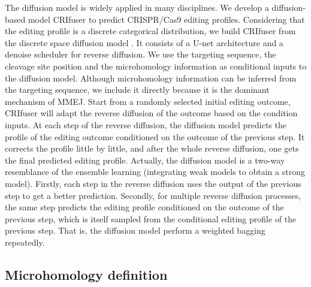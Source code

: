 \documentclass{article}
\begin{document}
The diffusion model is widely applied in many disciplines. We develop a diffusion-based model CRIfuser to predict CRISPR/Cas9 editing profiles. Considering that the editing profile is a discrete categorical distribution, we build CRIfuser from the discrete space diffusion model \cite{campbell2022continuous,zhao2024unified}. It consists of a U-net architecture and a denoise scheduler for reverse diffusion. We use the targeting sequence, the cleavage site position and the microhomology information as conditional inputs to the diffusion model. Although microhomology information can be inferred from the targeting sequence, we include it directly because it is the dominant mechanism of MMEJ. Start from a randomly selected initial editing outcome, CRIfuser will adapt the reverse diffusion of the outcome based on the condition inputs. At each step of the reverse diffusion, the diffusion model predicts the profile of the editing outcome conditioned on the outcome of the previous step. It corrects the profile little by little, and after the whole reverse diffusion, one gets the final predicted editing profile. Actually, the diffusion model is a two-way resemblance of the ensemble learning (integrating weak models to obtain a strong model). Firstly, each step in the reverse diffusion uses the output of the previous step to get a better prediction. Secondly, for multiple reverse diffusion processes, the same step predicts the editing profile conditioned on the outcome of the previous step, which is itself sampled from the conditional editing profile of the previous step. That is, the diffusion model perform a weighted bagging repeatedly.

\subsection{Microhomology definition}
\end{document}
